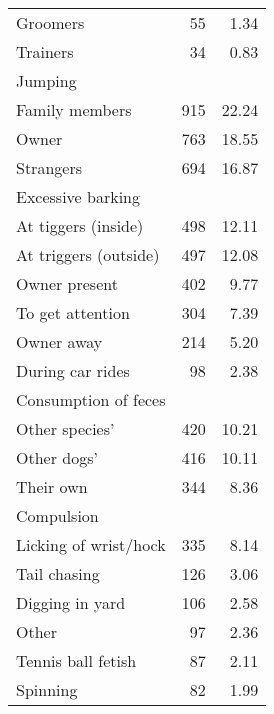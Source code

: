 \documentclass[varwidth=\maxdimen]{standalone}
\newcommand{\subrow}[1]{\hspace{1.25em}#1}
\begin{document}
\begin{tabular}[t]{lrr}
  \subrow{Groomers}                            &       55 &            1.34 \\
  \subrow{Trainers}                            &       34 &            0.83 \\
Jumping \\
  \subrow{Family members}                      &      915 &           22.24 \\
  \subrow{Owner}                               &      763 &           18.55 \\
  \subrow{Strangers}                           &      694 &           16.87 \\
Excessive barking \\
  \subrow{At tiggers (inside)}                 &      498 &           12.11 \\
  \subrow{At triggers (outside)}               &      497 &           12.08 \\
  \subrow{Owner present}                       &      402 &            9.77 \\
  \subrow{To get attention}                    &      304 &            7.39 \\
  \subrow{Owner away}                          &      214 &            5.20 \\
  \subrow{During car rides}                    &       98 &            2.38 \\
Consumption of feces \\
  \subrow{Other species'}                      &      420 &           10.21 \\
  \subrow{Other dogs'}                         &      416 &           10.11 \\
  \subrow{Their own}                           &      344 &            8.36 \\
Compulsion \\
  \subrow{Licking of wrist/hock}               &      335 &            8.14 \\
  \subrow{Tail chasing}                        &      126 &            3.06 \\
  \subrow{Digging in yard}                     &      106 &            2.58 \\
  \subrow{Other}                               &       97 &            2.36 \\
  \subrow{Tennis ball fetish}                  &       87 &            2.11 \\
  \subrow{Spinning}                            &       82 &            1.99 \\

\end{tabular}
\end{document}
